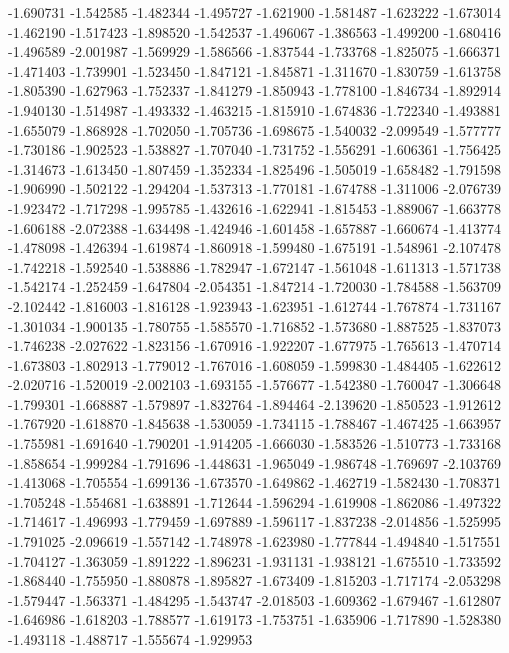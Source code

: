 -1.690731
-1.542585
-1.482344
-1.495727
-1.621900
-1.581487
-1.623222
-1.673014
-1.462190
-1.517423
-1.898520
-1.542537
-1.496067
-1.386563
-1.499200
-1.680416
-1.496589
-2.001987
-1.569929
-1.586566
-1.837544
-1.733768
-1.825075
-1.666371
-1.471403
-1.739901
-1.523450
-1.847121
-1.845871
-1.311670
-1.830759
-1.613758
-1.805390
-1.627963
-1.752337
-1.841279
-1.850943
-1.778100
-1.846734
-1.892914
-1.940130
-1.514987
-1.493332
-1.463215
-1.815910
-1.674836
-1.722340
-1.493881
-1.655079
-1.868928
-1.702050
-1.705736
-1.698675
-1.540032
-2.099549
-1.577777
-1.730186
-1.902523
-1.538827
-1.707040
-1.731752
-1.556291
-1.606361
-1.756425
-1.314673
-1.613450
-1.807459
-1.352334
-1.825496
-1.505019
-1.658482
-1.791598
-1.906990
-1.502122
-1.294204
-1.537313
-1.770181
-1.674788
-1.311006
-2.076739
-1.923472
-1.717298
-1.995785
-1.432616
-1.622941
-1.815453
-1.889067
-1.663778
-1.606188
-2.072388
-1.634498
-1.424946
-1.601458
-1.657887
-1.660674
-1.413774
-1.478098
-1.426394
-1.619874
-1.860918
-1.599480
-1.675191
-1.548961
-2.107478
-1.742218
-1.592540
-1.538886
-1.782947
-1.672147
-1.561048
-1.611313
-1.571738
-1.542174
-1.252459
-1.647804
-2.054351
-1.847214
-1.720030
-1.784588
-1.563709
-2.102442
-1.816003
-1.816128
-1.923943
-1.623951
-1.612744
-1.767874
-1.731167
-1.301034
-1.900135
-1.780755
-1.585570
-1.716852
-1.573680
-1.887525
-1.837073
-1.746238
-2.027622
-1.823156
-1.670916
-1.922207
-1.677975
-1.765613
-1.470714
-1.673803
-1.802913
-1.779012
-1.767016
-1.608059
-1.599830
-1.484405
-1.622612
-2.020716
-1.520019
-2.002103
-1.693155
-1.576677
-1.542380
-1.760047
-1.306648
-1.799301
-1.668887
-1.579897
-1.832764
-1.894464
-2.139620
-1.850523
-1.912612
-1.767920
-1.618870
-1.845638
-1.530059
-1.734115
-1.788467
-1.467425
-1.663957
-1.755981
-1.691640
-1.790201
-1.914205
-1.666030
-1.583526
-1.510773
-1.733168
-1.858654
-1.999284
-1.791696
-1.448631
-1.965049
-1.986748
-1.769697
-2.103769
-1.413068
-1.705554
-1.699136
-1.673570
-1.649862
-1.462719
-1.582430
-1.708371
-1.705248
-1.554681
-1.638891
-1.712644
-1.596294
-1.619908
-1.862086
-1.497322
-1.714617
-1.496993
-1.779459
-1.697889
-1.596117
-1.837238
-2.014856
-1.525995
-1.791025
-2.096619
-1.557142
-1.748978
-1.623980
-1.777844
-1.494840
-1.517551
-1.704127
-1.363059
-1.891222
-1.896231
-1.931131
-1.938121
-1.675510
-1.733592
-1.868440
-1.755950
-1.880878
-1.895827
-1.673409
-1.815203
-1.717174
-2.053298
-1.579447
-1.563371
-1.484295
-1.543747
-2.018503
-1.609362
-1.679467
-1.612807
-1.646986
-1.618203
-1.788577
-1.619173
-1.753751
-1.635906
-1.717890
-1.528380
-1.493118
-1.488717
-1.555674
-1.929953
